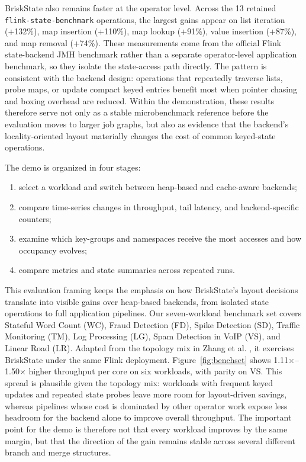 \documentclass[sigconf,nonacm]{acmart}
\newcommand{\briskstate}{BriskState\xspace}
\begin{document}
\briskstate also remains faster at the operator level. Across the 13 retained \texttt{flink-state-benchmark} operations, the largest gains appear on list iteration (+132\%), map insertion (+110\%), map lookup (+91\%), value insertion (+87\%), and map removal (+74\%). These measurements come from the official Flink state-backend JMH benchmark rather than a separate operator-level application benchmark, so they isolate the state-access path directly. The pattern is consistent with the backend design: operations that repeatedly traverse lists, probe maps, or update compact keyed entries benefit most when pointer chasing and boxing overhead are reduced. Within the demonstration, these results therefore serve not only as a stable microbenchmark reference before the evaluation moves to larger job graphs, but also as evidence that the backend's locality-oriented layout materially changes the cost of common keyed-state operations.

The demo is organized in four stages:
\begin{enumerate}
  \item select a workload and switch between heap-based and cache-aware backends;
  \item compare time-series changes in throughput, tail latency, and backend-specific counters;
  \item examine which key-groups and namespaces receive the most accesses and how occupancy evolves;
  \item compare metrics and state summaries across repeated runs.
\end{enumerate}

This evaluation framing keeps the emphasis on how BriskState's layout decisions translate into visible gains over heap-based backends, from isolated state operations to full application pipelines. Our seven-workload benchmark set covers Stateful Word Count (WC), Fraud Detection (FD), Spike Detection (SD), Traffic Monitoring (TM), Log Processing (LG), Spam Detection in VoIP (VS), and Linear Road (LR). Adapted from the topology mix in Zhang et al. \cite{zhang2017revisiting}, it exercises \briskstate under the same Flink deployment. Figure~\ref{fig:benchset} shows 1.11$\times$--1.50$\times$ higher throughput per core on six workloads, with parity on VS. This spread is plausible given the topology mix: workloads with frequent keyed updates and repeated state probes leave more room for layout-driven savings, whereas pipelines whose cost is dominated by other operator work expose less headroom for the backend alone to improve overall throughput. The important point for the demo is therefore not that every workload improves by the same margin, but that the direction of the gain remains stable across several different branch and merge structures.
\end{document}
